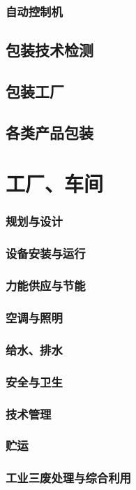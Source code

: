 \documentclass[UTF8]{../../ApplicationUniverse}
\begin{document}
        \subsubsection{自动控制机}
    \subsection{包装技术检测}
    \subsection{包装工厂}
    \subsection{各类产品包装}
\section{工厂、车间}
    \subsubsection{规划与设计}
    \subsubsection{设备安装与运行}
    \subsubsection{力能供应与节能}
    \subsubsection{空调与照明}
    \subsubsection{给水、排水}
    \subsubsection{安全与卫生}
    \subsubsection{技术管理}
    \subsubsection{贮运}
    \subsubsection{工业三废处理与综合利用}
\end{document}
